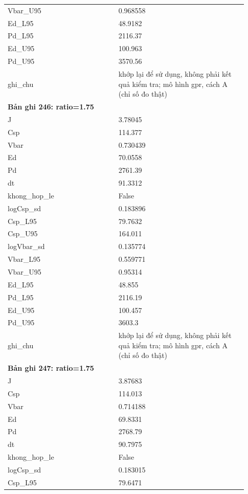 \begin{longtable}{p{0.43\linewidth}p{0.50\linewidth}}
Vbar\_\allowbreak U95 & 0.968558 \\
Ed\_\allowbreak L95 & 48.9182 \\
Pd\_\allowbreak L95 & 2116.37 \\
Ed\_\allowbreak U95 & 100.963 \\
Pd\_\allowbreak U95 & 3570.56 \\
ghi\_\allowbreak chu & khớp lại để sử dụng, không phải kết quả kiểm tra; mô hình gpr, cách A (chỉ số đo thật) \\
\midrule
\multicolumn{2}{p{0.95\linewidth}}{\textbf{Bản ghi 246: ratio=1.75}} \\
J & 3.78045 \\
Csp & 114.377 \\
Vbar & 0.730439 \\
Ed & 70.0558 \\
Pd & 2761.39 \\
dt & 91.3312 \\
khong\_\allowbreak hop\_\allowbreak le & False \\
logCsp\_\allowbreak sd & 0.183896 \\
Csp\_\allowbreak L95 & 79.7632 \\
Csp\_\allowbreak U95 & 164.011 \\
logVbar\_\allowbreak sd & 0.135774 \\
Vbar\_\allowbreak L95 & 0.559771 \\
Vbar\_\allowbreak U95 & 0.95314 \\
Ed\_\allowbreak L95 & 48.855 \\
Pd\_\allowbreak L95 & 2116.19 \\
Ed\_\allowbreak U95 & 100.457 \\
Pd\_\allowbreak U95 & 3603.3 \\
ghi\_\allowbreak chu & khớp lại để sử dụng, không phải kết quả kiểm tra; mô hình gpr, cách A (chỉ số đo thật) \\
\midrule
\multicolumn{2}{p{0.95\linewidth}}{\textbf{Bản ghi 247: ratio=1.75}} \\
J & 3.87683 \\
Csp & 114.013 \\
Vbar & 0.714188 \\
Ed & 69.8331 \\
Pd & 2768.79 \\
dt & 90.7975 \\
khong\_\allowbreak hop\_\allowbreak le & False \\
logCsp\_\allowbreak sd & 0.183015 \\
Csp\_\allowbreak L95 & 79.6471 \\

\end{longtable}

